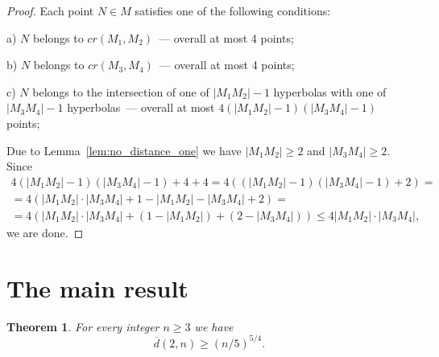 \documentclass[a4paper,14pt]{article} %
\theoremstyle{plain}
\newtheorem{theorem}{Theorem}[section]
\theoremstyle{definition}
\begin{document}
\begin{proof}
	Each point $N\in M$ satisfies one of the following conditions:

	a) $N$ belongs to $cr(M_1,M_2)$~--- overall at most 4 points;

	b) $N$ belongs to $cr(M_3,M_4)$~--- overall at most 4 points;

	c) $N$ belongs to the intersection of one of $|M_1 M_2| - 1$ hyperbolas
	with one of $|M_3 M_4| - 1$ hyperbolas~--- overall at most $4 (|M_1 M_2| - 1)(|M_3 M_4| - 1)$ points;

	Due to Lemma~\ref{lem:no_distance_one} we have $|M_1 M_2| \geq 2$ and $|M_3 M_4| \geq 2$.
	Since
	\begin{multline}
		4 (|M_1 M_2| - 1)(|M_3 M_4| - 1) + 4 + 4
		=
		4 ( (|M_1 M_2| - 1)(|M_3 M_4| - 1) + 2)
		=
		\\=
		4 ( |M_1 M_2| \cdot |M_3 M_4| + 1 - |M_1 M_2| - |M_3 M_4| + 2)
		=
		\\=
		4 ( |M_1 M_2| \cdot |M_3 M_4| + (1 - |M_1 M_2|) + (2 - |M_3 M_4|))
		\leq
		4 |M_1 M_2| \cdot |M_3 M_4|
		,
	\end{multline}
	we are done.
\end{proof}


\section{The main result}

\begin{theorem}
	\label{thm:main_result}
	For every integer $n \geq 3$ we have
	\begin{equation}
		\overline{d}(2,n) \geq (n/5)^{5/4}
		.
	\end{equation}
\end{theorem}
\end{document}
